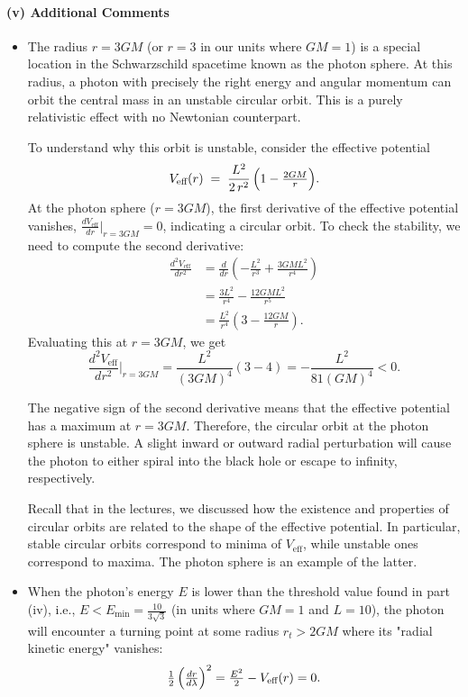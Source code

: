 \paragraph{(v) Additional Comments}

\begin{itemize}
    \item The radius \(r=3GM\) (or \(r=3\) in our units where \(GM=1\)) is a special location in the Schwarzschild spacetime known as the photon sphere. At this radius, a photon with precisely the right energy and angular momentum can orbit the central mass in an unstable circular orbit. This is a purely relativistic effect with no Newtonian counterpart.

    To understand why this orbit is unstable, consider the effective potential
    \[
    V_{\text{eff}}(r)
    \;=\;
    \frac{L^2}{2\,r^2}\,\Bigl(1-\tfrac{2GM}{r}\Bigr).
    \]
    At the photon sphere ($r=3GM$), the first derivative of the effective potential vanishes, $\frac{dV_{\text{eff}}}{dr}|_{r=3GM} = 0$, indicating a circular orbit.
    To check the stability, we need to compute the second derivative:
    \begin{align*}
        \frac{d^2V_{\text{eff}}}{dr^2} &= \frac{d}{dr}\left(-\frac{L^2}{r^3} + \frac{3GML^2}{r^4}\right) \\
        &= \frac{3L^2}{r^4} - \frac{12GML^2}{r^5} \\
        &= \frac{L^2}{r^4}\left(3 - \frac{12GM}{r}\right).
    \end{align*}
    Evaluating this at $r=3GM$, we get
    \[
        \frac{d^2V_{\text{eff}}}{dr^2}\Bigr|_{r=3GM} = \frac{L^2}{(3GM)^4}(3-4) = -\frac{L^2}{81(GM)^4} < 0.
    \]

    The negative sign of the second derivative means that the effective potential has a maximum at $r=3GM$. Therefore, the circular orbit at the photon sphere is unstable. A slight inward or outward radial perturbation will cause the photon to either spiral into the black hole or escape to infinity, respectively.

    Recall that in the lectures, we discussed how the existence and properties of circular orbits are related to the shape of the effective potential. In particular, stable circular orbits correspond to minima of $V_{\text{eff}}$, while unstable ones correspond to maxima. The photon sphere is an example of the latter.

    \item When the photon's energy \(E\) is lower than the threshold value found in part (iv), i.e., \(E < E_{\min} = \frac{10}{3\sqrt{3}}\) (in units where \(GM=1\) and \(L=10\)), the photon will encounter a turning point at some radius \(r_t > 2GM\) where its "radial kinetic energy" vanishes:
    \[
    \tfrac12\,\Bigl(\tfrac{dr}{d\lambda}\Bigr)^2 = \tfrac{E^2}{2} - V_{\text{eff}}(r) = 0.
    \]


\end{itemize}
